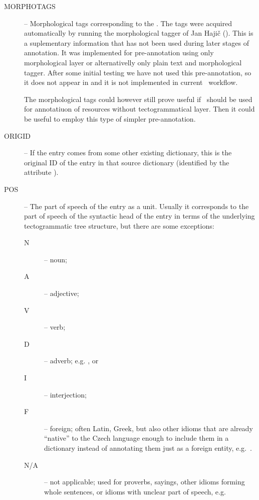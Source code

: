 \begin{description}
\item [MORPHO\textunderscore{}TAGS] -- Morphological tags corresponding to the . The tags were acquired automatically by running the morphological tagger of Jan Hajič (\citeyear{hajic:2004}). This is a suplementary information that has not been used during later stages of annotation. It was implemented for pre-annotation using only morphological layer or alternativelly only plain text and morphological tagger. After some initial testing we have not used this pre-annotation, so it does not appear in  and it is not implemented in current \seman\ workflow. 

The morphological tags could however still prove useful if \semlex\ should be used for annotatiuon of resources without tectogrammatical layer. Then it could be useful to employ this type of simpler pre-annotation.

\item [ORIGID] -- If the entry comes from some other existing dictionary, this is the original ID of the entry in that source dictionary (identified by the attribute ).

\item [POS] -- The part of speech of the entry as a unit. Usually it corresponds to the part of speech of the syntactic head of the entry in terms of the underlying tectogrammatic tree structure, but there are some exceptions:
  \begin{description}
    \item [N] -- noun; 
    \item [A] -- adjective; 
    \item [V] -- verb; 
    \item [D] -- adverb; e.g. , or 
    \item [I] -- interjection;
    \item [F] -- foreign; often Latin, Greek, but also other idioms that are already ``native'' to the Czech language enough to include them in a dictionary instead of annotating them just as a foreign entity, e.g.~.
    \item [N/A] -- not applicable; used for proverbs, sayings, other idioms forming whole sentences, or idioms with unclear part of speech, e.g. 
  \end{description} %


\end{description}
